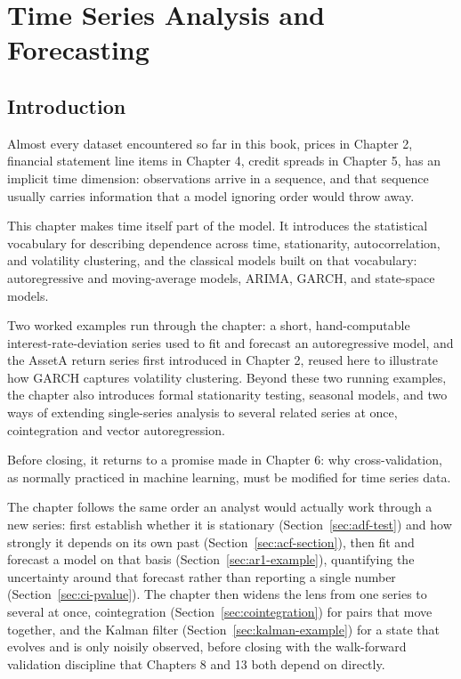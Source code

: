 \documentclass[../ai_in_finance]{subfiles}
\begin{document}
\chapter{Time Series Analysis and Forecasting}

\section{Introduction}

Almost every dataset encountered so far in this book, prices in Chapter 2, financial statement line items in Chapter 4, credit spreads in Chapter 5, has an implicit time dimension: observations arrive in a sequence, and that sequence usually carries information that a model ignoring order would throw away.

This chapter makes time itself part of the model. It introduces the statistical vocabulary for describing dependence across time, stationarity, autocorrelation, and volatility clustering, and the classical models built on that vocabulary: autoregressive and moving-average models, ARIMA, GARCH, and state-space models.

Two worked examples run through the chapter: a short, hand-computable interest-rate-deviation series used to fit and forecast an autoregressive model, and the AssetA return series first introduced in Chapter 2, reused here to illustrate how GARCH captures volatility clustering. Beyond these two running examples, the chapter also introduces formal stationarity testing, seasonal models, and two ways of extending single-series analysis to several related series at once, cointegration and vector autoregression.

Before closing, it returns to a promise made in Chapter 6: why cross-validation, as normally practiced in machine learning, must be modified for time series data.

The chapter follows the same order an analyst would actually work through a new series: first establish whether it is stationary (Section~\ref{sec:adf-test}) and how strongly it depends on its own past (Section~\ref{sec:acf-section}), then fit and forecast a model on that basis (Section~\ref{sec:ar1-example}), quantifying the uncertainty around that forecast rather than reporting a single number (Section~\ref{sec:ci-pvalue}). The chapter then widens the lens from one series to several at once, cointegration (Section~\ref{sec:cointegration}) for pairs that move together, and the Kalman filter (Section~\ref{sec:kalman-example}) for a state that evolves and is only noisily observed, before closing with the walk-forward validation discipline that Chapters 8 and 13 both depend on directly.
\end{document}
